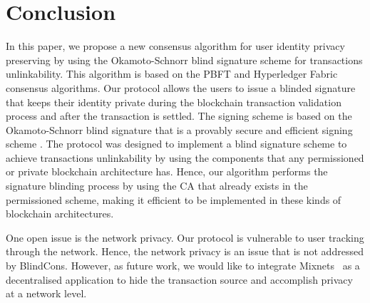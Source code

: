 \documentclass[conference]{llncs}
\newcommand{\name}{BlindCons}
\begin{document}
\section{Conclusion} \label{conclu}
In this paper, we propose a new consensus algorithm for user identity privacy preserving by using the Okamoto-Schnorr blind signature scheme for transactions unlinkability. This algorithm is based on the PBFT and Hyperledger Fabric consensus algorithms. Our protocol allows the users to issue a blinded signature that keeps their identity private during the blockchain transaction validation process and after the transaction is settled. The signing scheme is based on the Okamoto-Schnorr blind signature that is a provably secure \cite{pointcheval1996provably} and efficient signing scheme \cite{schnorr1991efficient}. The protocol was designed to implement a blind signature scheme to achieve transactions unlinkability by using the components that any permissioned or private blockchain architecture has. Hence, our algorithm performs the signature blinding process by using the CA that already exists in the permissioned scheme, making it efficient to be implemented in these kinds of blockchain architectures.

One open issue is the network privacy. Our protocol is vulnerable to user tracking through the network. Hence, the network privacy is an issue that is not addressed by \name{}. However, as future work, we would like to integrate Mixnets~\cite{Chaum:1981:UEM:358549.358563} as a decentralised application to hide the transaction source and accomplish privacy at a network level.



\end{document}
